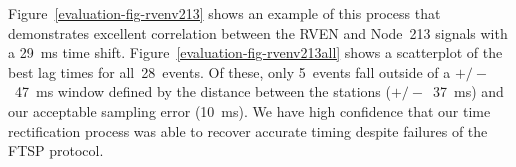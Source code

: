 Figure~\ref{evaluation-fig-rvenv213} shows an example of this process that
demonstrates excellent correlation between the RVEN and Node~213 signals with
a 29~ms time shift. Figure~\ref{evaluation-fig-rvenv213all} shows a
scatterplot of the best lag times for all~28~events. Of these, only 5~events
fall outside of a $+/-$~47~ms window defined by the distance between the
stations ($+/-$~37~ms) and our acceptable sampling error (10~ms). We have
high confidence that our time rectification process was able to recover
accurate timing despite failures of the FTSP protocol.
